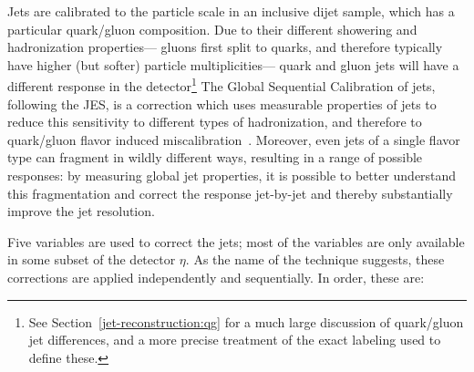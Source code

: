 Jets are calibrated to the particle scale in an inclusive dijet sample, which has a particular quark/gluon composition. Due to their different showering and hadronization properties--- gluons first split to quarks, and therefore typically have higher (but softer) particle multiplicities--- quark and gluon jets will have a different response in the detector\footnote{See Section~\ref{jet-reconstruction:qg} for a much large discussion of quark/gluon jet differences, and a more precise treatment of the exact labeling used to define these.} The Global Sequential Calibration of jets, following the JES, is a correction which uses measurable properties of jets to reduce this sensitivity to different types of hadronization, and therefore to quark/gluon flavor induced miscalibration~\cite{ATLAS-GSC}. Moreover, even jets of a single flavor type can fragment in wildly different ways, resulting in a range of possible responses: by measuring global jet properties, it is possible to better understand this fragmentation and correct the response jet-by-jet and thereby substantially improve the jet resolution.

Five variables are used to correct the jets; most of the variables are only available in some subset of the detector $\eta$. As the name of the technique suggests, these corrections are applied independently and sequentially. In order, these are:

